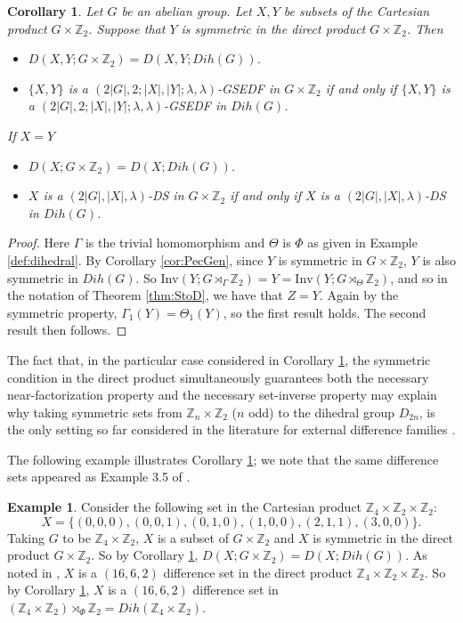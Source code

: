 \documentclass[12pt, a4paper]{article}
\newtheorem{corollary}[theorem]{Corollary}
\theoremstyle{definition}
\newtheorem{example}[theorem]{Example}
\begin{document}
\begin{corollary}\label{cor:Dih_StoD}
Let $G$ be an abelian group.  Let $X,Y$ be subsets of the Cartesian product $G \times \mathbb{Z}_2$. 
Suppose that $Y$ is symmetric in the direct product $G \times \mathbb{Z}_2$.  Then
\begin{itemize}
\item[(i)]$D(X, Y;  G \times \mathbb{Z}_2)= D(X,Y; Dih(G))$.
\item[(ii)] $\{X,Y\}$ is a $(2|G|,2;|X|,|Y|;\lambda,\lambda)$-GSEDF in $G \times \mathbb{Z}_2$ if and only if $\{X,Y\}$ is a $(2|G|,2;|X|,|Y|;\lambda,\lambda)$-GSEDF in $Dih(G)$.
\end{itemize}
If $X=Y$
\begin{itemize}
\item[(iii)] $D(X;  G \times \mathbb{Z}_2)= D(X; Dih(G))$.
\item[(iv)] $X$ is a $(2|G|,|X|,\lambda)$-DS in $G \times \mathbb{Z}_2$ if and only if $X$ is a $(2|G|,|X|,\lambda)$-DS in $Dih(G)$.
\end{itemize}
\end{corollary}
\begin{proof}
 Here $\Gamma$ is the trivial homomorphism and $\Theta$ is $\Phi$ as given in Example \ref{def:dihedral}.  By Corollary \ref{cor:PecGen}, since $Y$ is  symmetric in $G \times \mathbb{Z}_2$, $Y$ is also symmetric in $Dih(G)$.  So $\mathrm{Inv}(Y;G \rtimes_{\Gamma} \mathbb{Z}_2)=Y=\mathrm{Inv}(Y;G \rtimes_{\Theta} \mathbb{Z}_2)$, and so in the notation of Theorem \ref{thm:StoD}, we have that $Z=Y$. Again by the symmetric property, $\Gamma_1(Y)=\Theta_1(Y)$, so the first result holds.  The second result then follows.
\end{proof}

The fact that, in the particular case considered in Corollary \ref{cor:Dih_StoD}, the symmetric condition in the direct product simultaneously guarantees both the necessary near-factorization property and the necessary set-inverse property may explain why taking symmetric sets from $\mathbb{Z}_n \times \mathbb{Z}_2$ ($n$ odd)  to the dihedral group $D_{2n}$, is the only setting so far considered in the literature for external difference families \cite{KrePatSti}. 

The following example illustrates Corollary \ref{cor:Dih_StoD}; we note that the same difference sets appeared as Example 3.5 of \cite{Swa}.
\begin{example}
Consider the following set in the Cartesian product $\mathbb{Z}_4 \times \mathbb{Z}_2 \times \mathbb{Z}_2$:
\[X=\{(0,0,0),(0,0,1),(0,1,0),(1,0,0),(2,1,1),(3,0,0)\}.\]
Taking $G$ to be $\mathbb{Z}_4 \times \mathbb{Z}_2$, $X$ is a subset of $G \times \mathbb{Z}_2$ and $X$ is symmetric in the direct product $G \times \mathbb{Z}_2$.  So by Corollary \ref{cor:Dih_StoD}, $D(X;  G \times \mathbb{Z}_2)= D(X; Dih(G))$.
As noted in \cite{KreLiSti}, $X$ is a $(16,6,2)$ difference set in the direct product $\mathbb{Z}_4 \times \mathbb{Z}_2 \times \mathbb{Z}_2$.  So by Corollary \ref{cor:Dih_StoD}, $X$ is a $(16,6,2)$ difference set in $(\mathbb{Z}_4 \times \mathbb{Z}_2) \rtimes_\Phi \mathbb{Z}_2=Dih(\mathbb{Z}_4 \times \mathbb{Z}_2)$.
\end{example}
\end{document}
